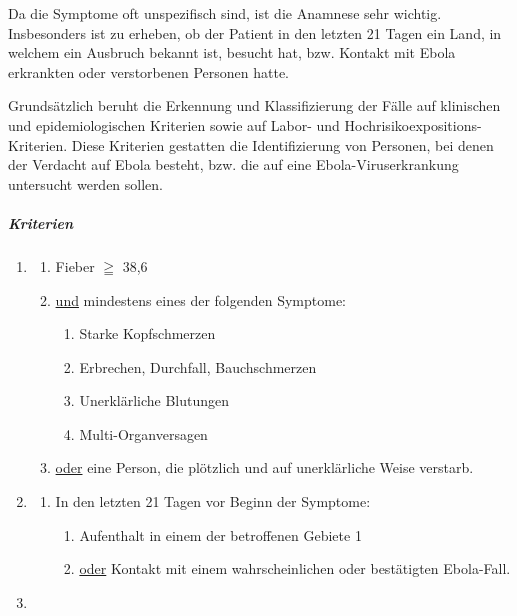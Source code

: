 {%
Da die Symptome oft unspezifisch sind, 
ist die Anamnese sehr wichtig. 
Insbesonders ist zu erheben, ob der Patient in den letzten 21 Tagen 
ein Land, in welchem ein Ausbruch bekannt ist, besucht hat, bzw. 
Kontakt mit Ebola erkrankten oder verstorbenen Personen hatte.

Grundsätzlich beruht die Erkennung und Klassifizierung der Fälle auf 
klinischen 
und epidemiologischen Kriterien 
sowie auf 
Labor- 
und Hochrisikoexpositions-Kriterien. 
%
Diese Kriterien gestatten die Identifizierung von Personen, 
bei denen der Verdacht auf Ebola besteht, bzw.
die auf eine Ebola-Viruserkrankung untersucht werden sollen.

\subparagraph{Kriterien}
\begin{enumerate}
  \item {}
  \begin{enumerate}
    \item Fieber $\geqq$ 38,6\textcelsius
    \item \underline{und} mindestens eines der folgenden Symptome:
    \begin{enumerate}
      \item Starke Kopfschmerzen
      \item Erbrechen, Durchfall, Bauchschmerzen
      \item Unerklärliche Blutungen
      \item Multi-Organversagen
    \end{enumerate}
    \item \underline{oder} eine Person, die plötzlich und auf unerklärliche Weise 
    verstarb.
  \end{enumerate}
  \item {}
  \begin{enumerate}
    \item In den letzten 21 Tagen vor Beginn der Symptome:
    \begin{enumerate}
      \item Aufenthalt in einem der betroffenen Gebiete 1
      \item \underline{oder}
          Kontakt mit einem wahrscheinlichen oder bestätigten 
          Ebola-Fall.
    \end{enumerate}

  \end{enumerate}
  \item {} 
  

\end{enumerate}}
